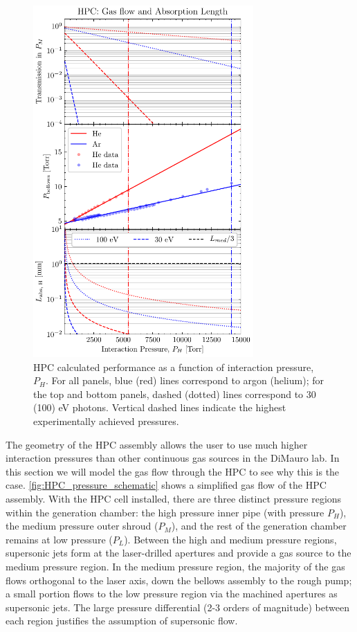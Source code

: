 \begin{figure}
	\centering
	\includegraphics[width=0.75\textwidth]{figures/chap3/HPC-gas-flow-int-length.pdf}
	\caption{HPC calculated performance as a function of interaction pressure, $P_H$. For all panels, blue (red) lines correspond to argon (helium); for the top and bottom panels, dashed (dotted) lines correspond to 30 (100) eV photons. Vertical dashed lines indicate the highest experimentally achieved pressures.}
	\label{fig:HPC-gas-flow-int-length}
\end{figure}

The geometry of the HPC assembly allows the user to use much higher interaction pressures than other continuous gas sources in the DiMauro lab. In this section we will model the gas flow through the HPC to see why this is the case. \cref{fig:HPC_pressure_schematic} shows a simplified gas flow of the HPC assembly. With the HPC cell installed, there are three distinct pressure regions within the generation chamber: the high pressure inner pipe (with pressure $P_H$), the medium pressure outer shroud ($P_M$), and the rest of the generation chamber remains at low pressure ($P_L$). Between the high and medium pressure regions, supersonic jets form at the laser-drilled apertures and provide a gas source to the medium pressure region. In the medium pressure region, the majority of the gas flows orthogonal to the laser axis, down the bellows assembly to the rough pump; a small portion flows to the low pressure region via the machined apertures as supersonic jets. The large pressure differential (2-3 orders of magnitude) between each region justifies the assumption of supersonic flow.


